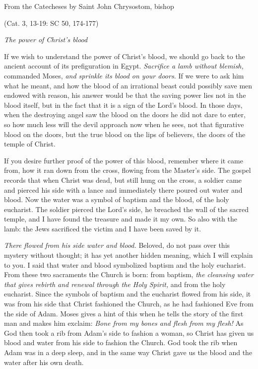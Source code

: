 \vspace{5pt}
\noindent From the Catecheses by Saint John Chrysostom, bishop

\par \hfill(Cat. 3, 13-19: SC 50, 174-177)

\begin{center}\textit{The power of Christ’s blood}\end{center}

\lettrine[lines=3]{I}{}f we wish to understand the power of Christ’s blood, we should go back to the ancient account of its prefiguration in Egypt. \textit{Sacrifice a lamb without blemish,} commanded Moses, \textit{and sprinkle its blood on your doors.} If we were to ask him what he meant, and how the blood of an irrational beast could possibly save men endowed with reason, his answer would be that the saving power lies not in the blood itself, but in the fact that it is a sign of the Lord’s blood. In those days, when the destroying angel saw the blood on the doors he did not dare to enter, so how much less will the devil approach now when he sees, not that figurative blood on the doors, but the true blood on the lips of believers, the doors of the temple of Christ.

If you desire further proof of the power of this blood, remember where it came from, how it ran down from the cross, flowing from the Master’s side. The gospel records that when Christ was dead, but still hung on the cross, a soldier came and pierced his side with a lance and immediately there poured out water and blood. Now the water was a symbol of baptism and the blood, of the holy eucharist. The soldier pierced the Lord’s side, he breached the wall of the sacred temple, and I have found the treasure and made it my own. So also with the lamb: the Jews sacrificed the victim and I have been saved by it.

\textit{There flowed from his side water and blood.} Beloved, do not pass over this mystery without thought; it has yet another hidden meaning, which I will explain to you. I said that water and blood symbolized baptism and the holy eucharist. From these two sacraments the Church is born: from baptism, \textit{the cleansing water that gives rebirth and renewal through the Holy Spirit,} and from the holy eucharist. Since the symbols of baptism and the eucharist flowed from his side, it was from his side that Christ fashioned the Church, as he had fashioned Eve from the side of Adam. Moses gives a hint of this when he tells the story of the first man and makes him exclaim: \textit{Bone from my bones and flesh from my flesh!} As God then took a rib from Adam’s side to fashion a woman, so Christ has given us blood and water from his side to fashion the Church. God took the rib when Adam was in a deep sleep, and in the same way Christ gave us the blood and the water after his own death.

